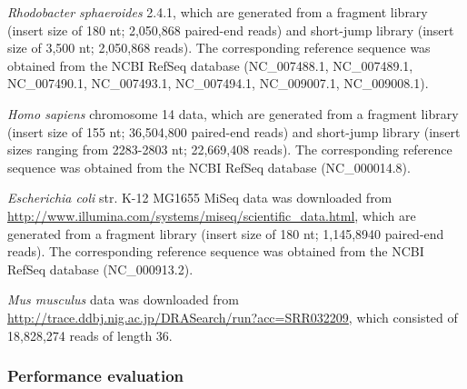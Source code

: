 \textit{Rhodobacter sphaeroides} 2.4.1, which are generated from a
fragment library (insert size of 180 nt; 2,050,868 paired-end reads)
and short-jump library (insert size of 3,500 nt; 2,050,868 reads). The
corresponding reference sequence was obtained from the NCBI RefSeq
database (NC\_007488.1, NC\_007489.1, NC\_007490.1, NC\_007493.1,
NC\_007494.1, NC\_009007.1, NC\_009008.1).


\textit{Homo sapiens} chromosome 14 data, which are generated from a
fragment library (insert size of 155 nt; 36,504,800 paired-end reads)
and short-jump library (insert sizes ranging from 2283-2803 nt;
22,669,408 reads). The corresponding reference sequence was obtained
from the NCBI RefSeq database (NC\_000014.8).

\textit{Escherichia coli} str. K-12 MG1655 MiSeq data was downloaded
from \url{http://www.illumina.com/systems/miseq/scientific_data.html},
which are generated from a fragment library (insert size of 180 nt;
1,145,8940 paired-end reads). The corresponding reference sequence
was obtained from the NCBI RefSeq database (NC\_000913.2).

\textit{Mus musculus} data was downloaded from
\url{http://trace.ddbj.nig.ac.jp/DRASearch/run?acc=SRR032209}, which
consisted of 18,828,274 reads of length 36.



\subsubsection{Performance evaluation}


